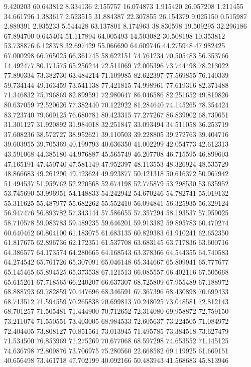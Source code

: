 9.420203
60.643812
8.334136
2.155757
16.074873
1.915420
26.057208
1.211455
34.661796
1.383617
2.523515
31.884387
22.307855
26.154379
9.025150
0.515987
2.889391
2.935233
5.544428
63.137801
8.174963
38.830598
19.509295
32.296186
67.894700
0.645404
51.117894
64.005493
14.503082
30.508198
10.353812
53.738876
6.128378
32.697429
55.066690
64.609746
44.275948
47.982425
67.000298
66.765025
66.361745
58.622151
74.761234
70.505483
56.353766
14.492477
80.171575
65.256244
72.511069
72.005396
73.744498
78.213022
77.890334
73.382730
63.484214
71.109985
82.622397
77.569855
76.140339
59.734144
49.163459
73.541138
77.421815
74.998961
77.619316
82.371488
71.346832
75.796869
82.899591
72.980647
86.046586
82.251652
49.819826
80.637059
72.520626
77.382440
70.122922
81.284640
74.145265
78.354424
83.723740
79.669125
76.680781
80.423315
77.277267
86.839902
68.739651
31.301127
31.920892
31.984018
32.251847
33.093494
34.511058
36.253719
37.608236
38.572727
38.952621
39.110503
39.228805
39.272763
39.404716
39.603955
39.705369
40.199793
40.636350
41.002299
42.054773
42.612313
43.591068
44.385180
44.976887
45.565749
46.207708
46.715595
46.899603
47.165191
47.450740
47.581149
47.952397
48.113553
48.326924
48.535729
48.866683
49.261290
49.423624
49.923877
50.121318
50.616372
50.967942
51.494537
51.959762
52.220568
52.674198
52.775879
53.298530
53.635952
53.745690
53.996951
54.148833
54.242942
54.670246
54.782741
55.019132
55.311625
55.487977
55.682262
55.552410
56.094841
56.325935
56.329124
56.947476
56.893782
57.343144
57.586655
57.357294
58.193537
57.959025
58.710578
59.083783
59.489235
59.646201
59.913382
59.895783
60.470274
60.640462
60.804100
61.183075
61.683135
60.829383
61.910241
62.652350
61.817675
62.896736
62.172351
61.537708
63.683145
63.717836
63.600716
64.386577
64.173574
64.280665
64.168543
63.378366
64.544355
64.740583
64.274542
65.761726
65.307091
65.046148
65.344667
65.809941
65.777677
65.145465
65.894525
65.373538
67.121513
66.085557
66.402116
67.505668
65.615261
67.718565
66.240207
66.637307
68.725809
67.955489
67.188972
68.888793
69.782859
70.447696
68.346591
67.367396
68.430898
70.699433
68.713512
71.594559
70.265838
70.699813
70.248025
73.048581
72.812143
68.701257
71.505481
71.444900
70.712652
72.314080
69.958872
72.759150
73.211074
71.550551
73.403005
68.984533
72.605637
73.224505
71.084972
72.404405
73.808127
70.851561
73.013945
71.495785
73.384518
73.627479
71.534500
76.853969
71.275269
70.677068
68.597298
74.653552
71.145125
74.636798
72.809876
73.706975
75.280560
22.668582
69.119925
61.669151
40.656498
73.461718
47.702199
40.092166
50.483943
41.568683
45.813946
